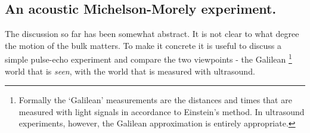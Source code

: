 








\subsection{An acoustic Michelson-Morely  experiment.}



The discussion so far has been somewhat abstract.
It is not clear to what degree the motion of the bulk matters.
To make it concrete it is useful to discuss a simple pulse-echo experiment and  compare the two viewpoints
- the Galilean%
\footnote{Formally the `Galilean' measurements are the distances and times that are  measured with light signals in accordance to Einstein's method\cite{Einstein1905}.
In ultrasound experiments, however, the Galilean approximation is entirely appropriate.}
 world that is {\em seen}, with the world that is measured with ultrasound. %
%


